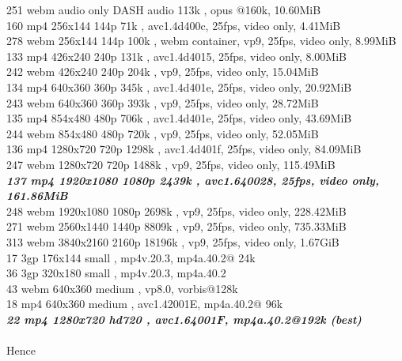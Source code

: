 \documentclass[10pt,a4paper]{article}
\begin{document}
{{{{{{{{{{{{{{251          webm       audio only DASH audio  113k , opus @160k, 10.60MiB\\
160          mp4        256x144    144p   71k , avc1.4d400c, 25fps, video only, 4.41MiB\\
278          webm       256x144    144p  100k , webm container, vp9, 25fps, video only, 8.99MiB\\
133          mp4        426x240    240p  131k , avc1.4d4015, 25fps, video only, 8.00MiB\\
242          webm       426x240    240p  204k , vp9, 25fps, video only, 15.04MiB\\
134          mp4        640x360    360p  345k , avc1.4d401e, 25fps, video only, 20.92MiB\\
243          webm       640x360    360p  393k , vp9, 25fps, video only, 28.72MiB\\
135          mp4        854x480    480p  706k , avc1.4d401e, 25fps, video only, 43.69MiB\\
244          webm       854x480    480p  720k , vp9, 25fps, video only, 52.05MiB\\
136          mp4        1280x720   720p 1298k , avc1.4d401f, 25fps, video only, 84.09MiB\\
247          webm       1280x720   720p 1488k , vp9, 25fps, video only, 115.49MiB\\
\textbf{\textit{137          mp4        1920x1080  1080p 2439k , avc1.640028, 25fps, video only, 161.86MiB}}}{\large {\large \\
248          webm       1920x1080  1080p 2698k , vp9, 25fps, video only, 228.42MiB\\
271          webm       2560x1440  1440p 8809k , vp9, 25fps, video only, 735.33MiB\\
313          webm       3840x2160  2160p 18196k , vp9, 25fps, video only, 1.67GiB\\
17           3gp        176x144    small , mp4v.20.3, mp4a.40.2@ 24k\\
36           3gp        320x180    small , mp4v.20.3, mp4a.40.2\\
43           webm       640x360    medium , vp8.0, vorbis@128k\\
18           mp4        640x360    medium , avc1.42001E, mp4a.40.2@ 96k\\
\textbf{\textit{22           mp4        1280x720   hd720 , avc1.64001F, mp4a.40.2@192k (best)}}}{\large {\large \\
\\
Hence\\
}}}}}}}}}}}}}}}}
\end{document}
